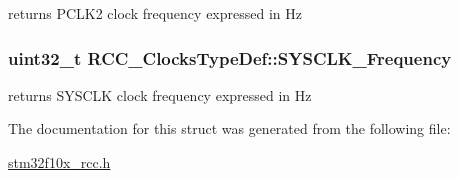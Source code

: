 \label{structRCC__ClocksTypeDef_ad854f0b70a6c4cf6de6dbbdcbc99b856}
returns PCLK2 clock frequency expressed in Hz \hypertarget{structRCC__ClocksTypeDef_a2ba325067f3d464ad7955358932563d8}{
\subsubsection[{SYSCLK\_\-Frequency}]{\setlength{\rightskip}{0pt plus 5cm}uint32\_\-t {\bf RCC\_\-ClocksTypeDef::SYSCLK\_\-Frequency}}}
\label{structRCC__ClocksTypeDef_a2ba325067f3d464ad7955358932563d8}
returns SYSCLK clock frequency expressed in Hz 

The documentation for this struct was generated from the following file:\begin{DoxyCompactItemize}
\item 
\hyperlink{stm32f10x__rcc_8h}{stm32f10x\_\-rcc.h}\end{DoxyCompactItemize}
